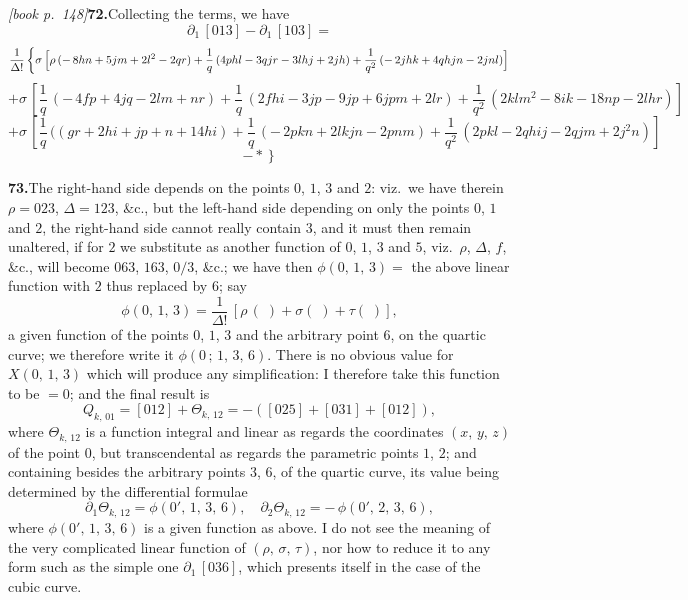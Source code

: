 \documentclass[11pt,a4paper]{article}
\theoremstyle{plain}
\theoremstyle{definition}
\theoremstyle{remark}
\begin{document}
\medskip\noindent\textit{[book p.~148]}\quad \textbf{72.}\quad Collecting the terms, we have
\[
\partial_1\,[013] - \partial_1\,[103] =
\]
\[
\frac{1}{\Delta!}\left\{\sigma\,\Bigl[\rho\,(-\,8hn + 5jm + 2l^{2} - 2qr) + \frac{1}{q}\,(4phl - 3qj r - 3lhj + 2jh) + \frac{1}{q^{2}}\,(-\,2jhk + 4qhjn - 2jnl)\Bigr]\right.
\]
\[
+ \sigma\,\left[\frac{1}{q}\,(-\,4fp + 4jq - 2lm + nr) + \frac{1}{q}\,(2fhi - 3jp - 9jp + 6jpm + 2lr) + \frac{1}{q^{2}}\,(2k l m^{2} - 8 i k - 18np - 2lhr)\right]
\]
\[
+ \sigma\,\left[\frac{1}{q}\,((gr + 2hi + jp + n + 14hi) + \frac{1}{q}\,(-\,2pkn + 2lkj n - 2pnm) + \frac{1}{q^{2}}\,(2pkl - 2qhij - 2qjm + 2j^{2}n)\right]
\]
\[
\left.- *\right\}
\]

\medskip\noindent\textbf{73.}\quad The right-hand side depends on the points $0$, $1$, $3$ and $2$: viz.\ we have therein $\rho = 023$, $\Delta = 123$, \&c., but the left-hand side depending on only the points $0$, $1$ and $2$, the right-hand side cannot really contain $3$, and it must then remain unaltered, if for $2$ we substitute as another function of $0$, $1$, $3$ and $5$, viz.\ $\rho$, $\Delta$, $f$, \&c., will become $063$, $163$, $0/3$, \&c.; we have then $\phi(0,\,1,\,3) = $ the above linear function with $2$ thus replaced by $6$; say
\[
\phi(0,\,1,\,3) = \frac{1}{\Delta!}\,[\rho\,(\;) + \sigma(\;) + \tau(\;)],
\]
a given function of the points $0$, $1$, $3$ and the arbitrary point $6$, on the quartic curve; we therefore write it $\phi(0\,;\,1,\,3,\,6)$. There is no obvious value for $X(0,\,1,\,3)$ which will produce any simplification: I therefore take this function to be $= 0$; and the final result is
\[
Q_{k,\,01} = [012] + \Theta_{k,\,12} = -([025] + [031] + [012]),
\]
where $\Theta_{k,\,12}$ is a function integral and linear as regards the coordinates $(x,\,y,\,z)$ of the point $0$, but transcendental as regards the parametric points $1$, $2$; and containing besides the arbitrary points $3$, $6$, of the quartic curve, its value being determined by the differential formulae
\[
\partial_1\Theta_{k,\,12} = \phi(0',\,1,\,3,\,6),\quad \partial_2\Theta_{k,\,12} = -\,\phi(0',\,2,\,3,\,6),
\]
where $\phi(0',\,1,\,3,\,6)$ is a given function as above. I do not see the meaning of the very complicated linear function of $(\rho,\,\sigma,\,\tau)$, nor how to reduce it to any form such as the simple one $\partial_1\,[036]$, which presents itself in the case of the cubic curve.
\end{document}
